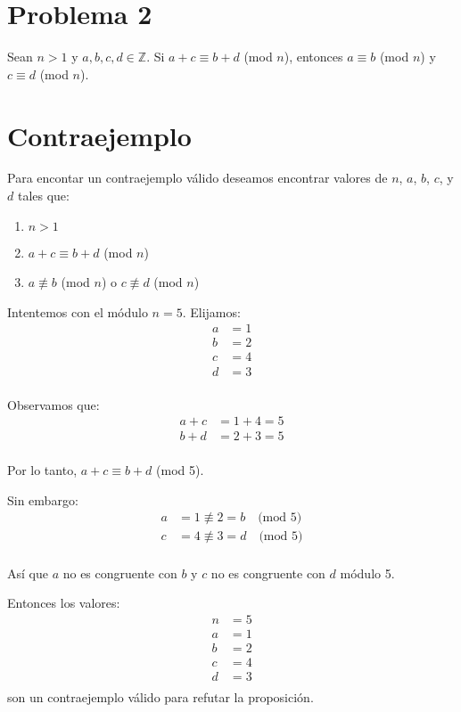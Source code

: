 \documentclass{article}
\begin{document}
\section*{Problema 2}
Sean \( n > 1 \) y \( a, b, c, d \in \mathbb{Z} \). Si \( a+c \equiv b+d \) (mod \( n \)), entonces \( a \equiv b \) (mod \( n \)) y \( c \equiv d \) (mod \( n \)).

\section*{Contraejemplo}

Para encontar un contraejemplo válido deseamos encontrar valores de \( n \), \( a \), \( b \), \( c \), y \( d \) tales que:

\begin{enumerate}
    \item \( n > 1 \)
    \item \( a + c \equiv b + d \) (mod \( n \))
    \item \( a \not\equiv b \) (mod \( n \)) o \( c \not\equiv d \) (mod \( n \))
\end{enumerate}

Intentemos con el módulo \( n = 5 \). Elijamos:
\[
\begin{aligned}
    a &= 1 \\
    b &= 2 \\
    c &= 4 \\
    d &= 3 \\   
\end{aligned}
\]

Observamos que:
\[
\begin{aligned}
    a + c &= 1 + 4 = 5 \\
    b + d &= 2 + 3 = 5 \\
\end{aligned}
\]

Por lo tanto, \( a + c \equiv b + d \) (mod 5).

Sin embargo:
\[
\begin{aligned}
    a &= 1 \not\equiv 2 = b \quad \text{(mod 5)} \\
    c &= 4 \not\equiv 3 = d \quad \text{(mod 5)} \\
\end{aligned}
\]

Así que \( a \) no es congruente con \( b \) y \( c \) no es congruente con \( d \) módulo 5.

Entonces los valores:
\[
\begin{aligned}
    n &= 5 \\
    a &= 1 \\
    b &= 2 \\
    c &= 4 \\
    d &= 3 \\
\end{aligned}
\]
son un contraejemplo válido para refutar la proposición.
\end{document}
